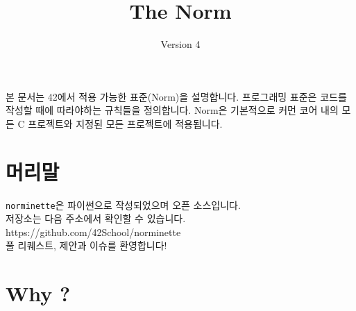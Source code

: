 \documentclass{42-ko}
\begin{document}
\title{The Norm}
\subtitle{Version 4}

\summary
{
    본 문서는 42에서 적용 가능한 표준(Norm)을 설명합니다.
    프로그래밍 표준은 코드를 작성할 때에 따라야하는 규칙들을 정의합니다.
    Norm은 기본적으로 커먼 코어 내의 모든 C 프로젝트와
    지정된 모든 프로젝트에 적용됩니다.
}

\maketitle

\tableofcontents



\chapter{머리말}

    \texttt{norminette}은 파이썬으로 작성되었으며 오픈 소스입니다. \\
    저장소는 다음 주소에서 확인할 수 있습니다. https://github.com/42School/norminette \\
    풀 리퀘스트, 제안과 이슈를 환영합니다!

    \newpage


%
%
    \chapter{Why ?}
\end{document}
